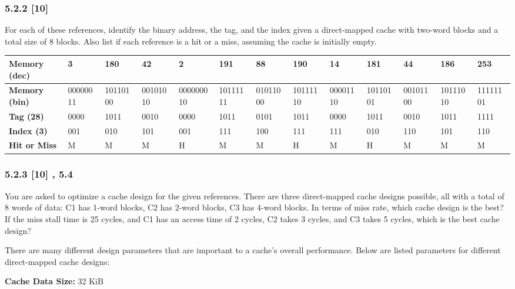 \documentclass[fleqn]{article}
\begin{document}
\subsubsection*{5.2.2 [10] \textrangle} For each of these references, identify the binary address, the tag, and the index given a direct-mapped cache with two-word blocks and a total size of 8 blocks. Also list if each reference is a hit or a miss, assuming the cache is initially empty.
\begin{table}[H]
    \setlength{\tabcolsep}{3pt}
    \fontsize{6pt}{12pt}\selectfont
    \begin{tabular}{l|l|l|l|l|l|l|l|l|l|l|l|l}
    \textbf{Memory (dec)} & \textbf{3} & \textbf{180} & \textbf{42} & \textbf{2} & \textbf{191} & \textbf{88} & \textbf{190} & \textbf{14} & \textbf{181} & \textbf{44} & \textbf{186} & \textbf{253} \\ \hline
    \textbf{Memory (bin)} & 00000011 & 10110100 & 00101010 & 000000010 & 10111111 & 01011000 & 10111110 & 00001110 & 10110101 & 00101100 & 10111010 & 11111101 \\
    \textbf{Tag (28)} & 0000 & 1011 & 0010 & 0000 & 1011 & 0101 & 1011 & 0000 & 1011 & 0010 & 1011 & 1111 \\
    \textbf{Index (3)} & 001 & 010 & 101 & 001 & 111 & 100 & 111 & 111 & 010 & 110 & 101 & 110 \\
    \textbf{Hit or Miss} & M & M & M & H & M & M & H & M & H & M & M & M
    \end{tabular}
\end{table}

\subsubsection*{5.2.3 [10] , 5.4\textrangle} You are asked to optimize a cache design for the given references. There are three direct-mapped cache designs possible, all with a total of 8 words of data:
C1 has 1-word blocks,
C2 has 2-word blocks,
C3 has 4-word blocks.
In terms of miss rate, which cache design is the best? If the miss stall time is 25 cycles, and C1 has an access time of 2 cycles, C2 takes 3 cycles, and C3 takes 5 cycles, which is the best cache design?

There are many different design parameters that are important to a cache's overall performance. Below are listed parameters for different direct-mapped cache designs:

\textbf{Cache Data Size:} 32 KiB
\end{document}
